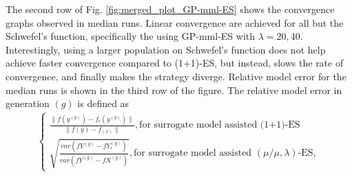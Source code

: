 The second row of Fig. \ref{fig:merged_plot_GP-mml-ES} shows the convergence graphs observed in median runs. Linear convergence are achieved for all but the Schwefel's function, specifically the using GP-mml-ES with $\lambda=20,40$. Interestingly, using a larger population on Schwefel's function does not help achieve faster convergence compared to (1+1)-ES, but instead, slows the  rate of convergence, and finally makes the strategy diverge. Relative model error for the median runs is shown in the third row of the figure. The relative model error in generation $(g)$ is defined as 
\begin{align}
\begin{cases}
\frac{\|f(y^{(g)})-f_{\epsilon}(y^{(g)}) \|}{\|f(y)-f_(x) \|},\text{for surrogate model assisted (1+1)-ES} \\
\sqrt{\frac{ var(fY^{(g)}-fY_{\epsilon}^{(g)})}{var(fY^{(g)}-fX^{(g)})}},\text{for surrogate model assisted }(\mu/\mu,\lambda)\text{-ES},
\end{cases}
\end{align}
